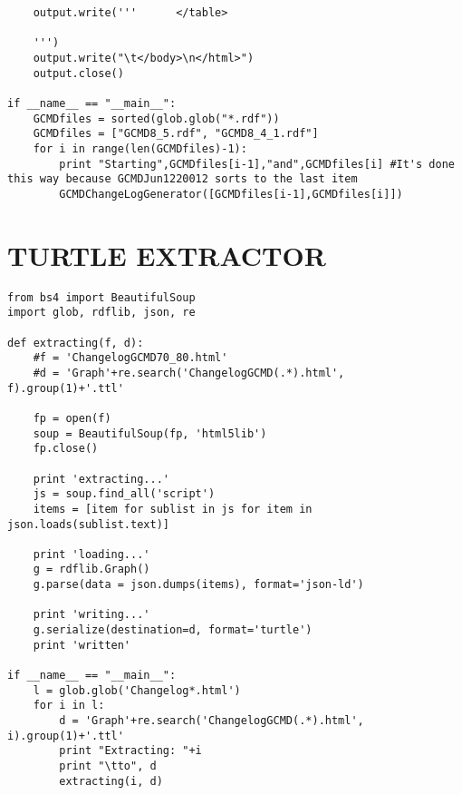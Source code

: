\begin{verbatim}
	output.write('''      </table>
	
	''')
	output.write("\t</body>\n</html>")
	output.close()

if __name__ == "__main__":
	GCMDfiles = sorted(glob.glob("*.rdf"))
	GCMDfiles = ["GCMD8_5.rdf", "GCMD8_4_1.rdf"]
	for i in range(len(GCMDfiles)-1):
		print "Starting",GCMDfiles[i-1],"and",GCMDfiles[i] #It's done this way because GCMDJun1220012 sorts to the last item
		GCMDChangeLogGenerator([GCMDfiles[i-1],GCMDfiles[i]])
\end{verbatim}

\chapter{TURTLE EXTRACTOR} \label{extractor}
\begin{verbatim}
from bs4 import BeautifulSoup
import glob, rdflib, json, re

def extracting(f, d):
	#f = 'ChangelogGCMD70_80.html'
	#d = 'Graph'+re.search('ChangelogGCMD(.*).html', f).group(1)+'.ttl'

	fp = open(f)
	soup = BeautifulSoup(fp, 'html5lib')
	fp.close()

	print 'extracting...'
	js = soup.find_all('script')
	items = [item for sublist in js for item in json.loads(sublist.text)]

	print 'loading...'
	g = rdflib.Graph()
	g.parse(data = json.dumps(items), format='json-ld')

	print 'writing...'
	g.serialize(destination=d, format='turtle')
	print 'written'

if __name__ == "__main__":
	l = glob.glob('Changelog*.html')
	for i in l:
		d = 'Graph'+re.search('ChangelogGCMD(.*).html', i).group(1)+'.ttl'
		print "Extracting: "+i
		print "\tto", d
		extracting(i, d)
\end{verbatim}

